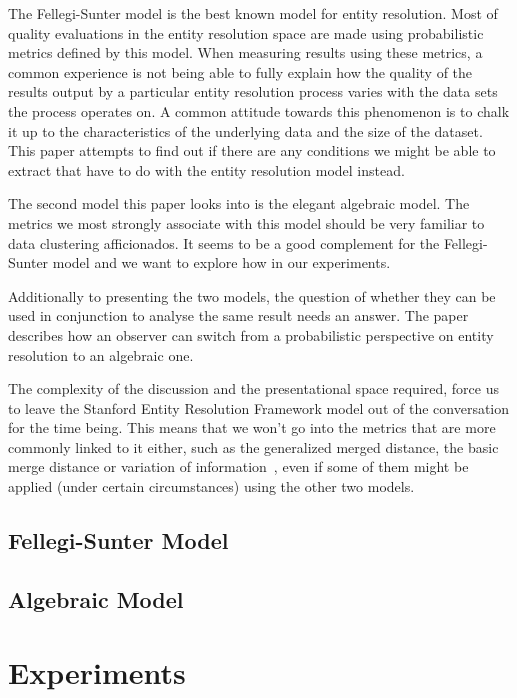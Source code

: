 \documentclass[journal]{IEEEtran}
\begin{document}
    The Fellegi-Sunter model is the best known model for entity resolution.
    Most of quality evaluations in the entity resolution space are made using
    probabilistic metrics defined by this model.
    When measuring results using these metrics, a common experience is not being
    able to fully explain how the quality of the results output by a particular
    entity resolution process varies with the data sets the process operates on.
    A common attitude towards this phenomenon is to chalk it up to the
    characteristics of the underlying data and the size of the dataset.
    This paper attempts to find out if there are any conditions we might be able
    to extract that have to do with the entity resolution model instead.

    The second model this paper looks into is the elegant algebraic model.
    The metrics we most strongly associate with this model should be very
    familiar to data clustering afficionados.
    It seems to be a good complement for the Fellegi-Sunter model and we want to
    explore how in our experiments.

    Additionally to presenting the two models, the question of whether they can
    be used in conjunction to analyse the same result needs an answer.
    The paper describes how an observer can switch from a probabilistic
    perspective on entity resolution to an algebraic one.

    The complexity of the discussion and the presentational space required,
    force us to leave the Stanford Entity Resolution Framework model out of the
    conversation for the time being.
    This means that we won't go into the metrics that are more commonly linked
    to it either, such as the generalized merged distance, the basic merge
    distance or variation of information~\cite{Men10}, even if some of them
    might be applied (under certain circumstances) using the other two models.

    \subsection{Fellegi-Sunter Model}\label{subsec:Fellegi-Sunter Model}
    

    \subsection{Algebraic Model}\label{subsec:Algebraic Model}
    

    \section{Experiments}\label{sec:Experiments}
    
\end{document}

